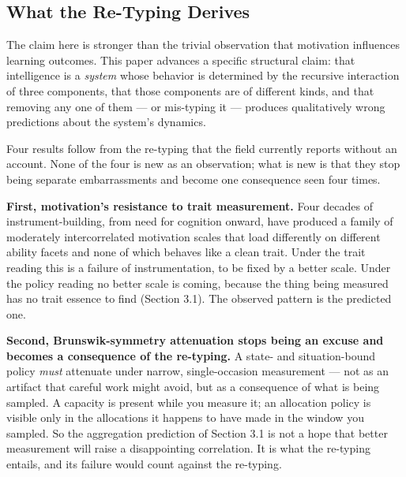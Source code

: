 \documentclass[12pt,a4paper]{article}
\begin{document}
\subsection{What the Re-Typing Derives}

The claim here is stronger than the trivial observation that motivation influences learning outcomes. This paper advances a specific structural claim: that intelligence is a \emph{system} whose behavior is determined by the recursive interaction of three components, that those components are of different kinds, and that removing any one of them ---\hspace{0pt} or mis-typing it ---\hspace{0pt} produces qualitatively wrong predictions about the system's dynamics.

Four results follow from the re-typing that the field currently reports without an account. None of the four is new as an observation; what is new is that they stop being separate embarrassments and become one consequence seen four times.

\textbf{First, motivation's resistance to trait measurement.} Four decades of instrument-building, from need for cognition \citep{CacioppioPetty1982} onward, have produced a family of moderately intercorrelated motivation scales that load differently on different ability facets and none of which behaves like a clean trait. Under the trait reading this is a failure of instrumentation, to be fixed by a better scale. Under the policy reading no better scale is coming, because the thing being measured has no trait essence to find (Section 3.1). The observed pattern is the predicted one.

\textbf{Second, Brunswik-symmetry attenuation stops being an excuse and becomes a consequence of the re-typing.} A state- and situation-bound policy \emph{must} attenuate under narrow, single-occasion measurement ---\hspace{0pt} not as an artifact that careful work might avoid, but as a consequence of what is being sampled. A capacity is present while you measure it; an allocation policy is visible only in the allocations it happens to have made in the window you sampled. So the aggregation prediction of Section 3.1 is not a hope that better measurement will raise a disappointing correlation. It is what the re-typing entails, and its failure would count against the re-typing.
\end{document}
